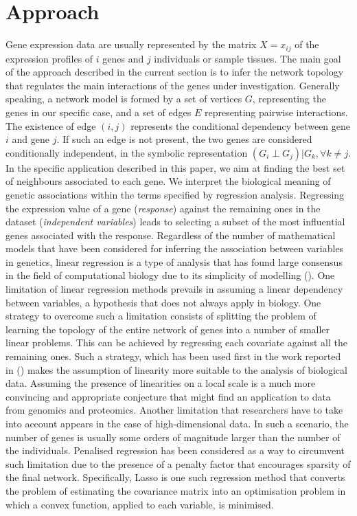 \section{Approach}\label{approach}
Gene expression data are usually represented by the matrix $X = x_{ij}$ of the expression profiles of $i$ genes and $j$ individuals or sample tissues. 
The main goal of the approach described in the current section is to infer the network topology that regulates the main interactions of the genes under investigation. 
Generally speaking, a network model is formed by a set of vertices $G$, representing the genes in our specific case, and a set of edges $E$ representing pairwise interactions. The existence of edge $(i,j)$ represents the conditional dependency between gene $i$ and gene $j$.  If such an edge is not present, the two genes are considered conditionally independent, in the symbolic representation $(G_i \perp G_j) | G_k, \forall k \neq j$.
In the specific application described in this paper, we aim at finding the best set of neighbours associated to each gene. We interpret the biological meaning of genetic associations within the terms specified by regression analysis. Regressing the expression value of a gene (\emph{response}) against the remaining ones in the dataset (\emph{independent variables}) leads to selecting a subset of the most influential genes associated with the response.
Regardless of the number of mathematical models that have been considered for inferring the association between variables in genetics, linear regression is a type of analysis that has found large consensus in the field of computational biology due to its simplicity of modelling (\citealp{linregression2, linregression1}). %
One limitation of linear regression methods prevails in assuming a linear dependency between variables, a hypothesis that does not always apply in biology. One strategy to overcome such a limitation consists of splitting the problem of learning the topology of the entire network of genes into a number of smaller linear problems. This can be achieved by regressing each covariate against all the remaining ones.  Such a strategy, which has been used first in the work reported in (\citealp{Meinshausen06highdimensional}) makes the assumption of linearity more suitable to the analysis of biological data.  Assuming the presence of linearities on a local scale is a much more convincing and appropriate conjecture that might find an application to data from genomics and proteomics.
Another limitation that researchers have to take into account appears in the case of high-dimensional data. In such a scenario, the number of genes is usually some orders of magnitude larger than the number of the individuals. 
Penalised regression has been considered as a way to circumvent such limitation due to the presence of a penalty factor that encourages sparsity of the final network.
Specifically, Lasso is one such regression method that converts the problem of estimating the covariance matrix into an optimisation problem in which a convex function, applied to each variable, is minimised.

